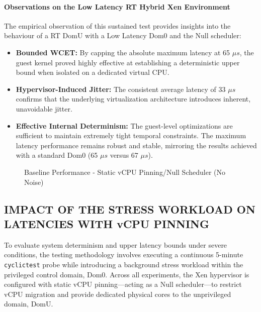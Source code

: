\paragraph{Observations on the Low Latency RT Hybrid Xen
Environment}\label{observations-on-the-low-latency-rt-hybrid-xen-environment-2}

The empirical observation of this sustained test provides insights into
the behaviour of a RT DomU with a Low Latency Dom0 and the Null
scheduler:

\begin{itemize}
\item
  \textbf{Bounded WCET:} By capping the absolute maximum latency at 65
  $\mu s$, the guest kernel proved highly effective at establishing a
  deterministic upper bound when isolated on a dedicated virtual CPU.
\item
  \textbf{Hypervisor-Induced Jitter:} The consistent average latency of
  33 $\mu s$ confirms that the underlying virtualization architecture
  introduces inherent, unavoidable jitter.
\item
  \textbf{Effective Internal Determinism:} The guest-level optimizations
  are sufficient to maintain extremely tight temporal constraints. The
  maximum latency performance remains robust and stable, mirroring the
  results achieved with a standard Dom0 (65 $\mu s$ versus 67 $\mu s$).
\end{itemize}

\begin{figure}
\centering

\caption{Baseline Performance - Static vCPU Pinning/Null Scheduler (No
Noise)}
\end{figure}

\subsection{IMPACT OF THE STRESS WORKLOAD ON LATENCIES WITH vCPU
PINNING}\label{impact-of-the-stress-workload-on-latencies-with-vcpu-pinning}

To evaluate system determinism and upper latency bounds under severe
conditions, the testing methodology involves executing a continuous
5-minute \texttt{cyclictest} probe while introducing a background stress
workload within the privileged control domain, Dom0. Across all
experiments, the Xen hypervisor is configured with static vCPU
pinning---acting as a Null scheduler---to restrict vCPU migration and
provide dedicated physical cores to the unprivileged domain, DomU.

